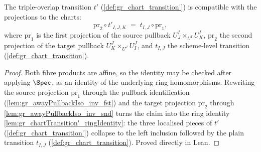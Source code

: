 \begin{lemma}\leanok
  \label{lem:gr_chartTransition'_fac}
  The triple-overlap transition \(t'\) (\cref{def:gr_chart_transition'}) is
  compatible with the projections to the charts:
  \[
    \mathrm{pr}_2 \circ t'_{I,J,K} \;=\; t_{I,J} \circ \mathrm{pr}_1 ,
  \]
  where \(\mathrm{pr}_1\) is the first projection of the source pullback
  \(U^I_J \times_{U^I} U^I_K\), \(\mathrm{pr}_2\) the second projection of the
  target pullback \(U^J_K \times_{U^J} U^J_I\), and \(t_{I,J}\) the scheme-level
  transition (\cref{def:gr_chart_transition}).
\end{lemma}
\begin{proof}
  \leanok
  Both fibre products are affine, so the identity may be checked after applying
  \(\Spec\), as an identity of the underlying ring homomorphisms. Rewriting the
  source projection \(\mathrm{pr}_1\) through the pullback identification
  (\cref{lem:gr_awayPullbackIso_inv_fst}) and the target projection
  \(\mathrm{pr}_2\) through \cref{lem:gr_awayPullbackIso_inv_snd} turns the claim
  into the ring identity \cref{lem:gr_chartTransition'_ringIdentity}: the three
  localised pieces of \(t'\) (\cref{def:gr_chart_transition'}) collapse to the
  left inclusion followed by the plain transition \(t_{I,J}\)
  (\cref{def:gr_chart_transition}). Proved directly in Lean.
\end{proof}

